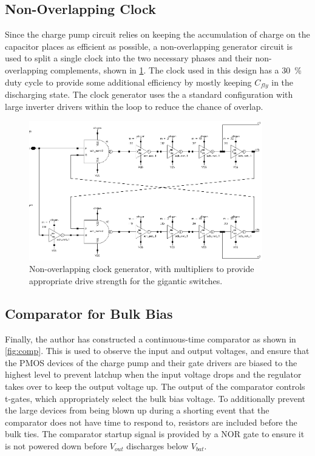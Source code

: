 \documentclass[11pt,letterpaper]{article}
\begin{document}
\subsection{Non-Overlapping Clock}

Since the charge pump circuit relies on keeping the accumulation of charge on the capacitor places as efficient as possible, a non-overlapping generator circuit is used to split a single clock into the two necessary phases and their non-overlapping complements, shown in \cref{fig:clkgen}. The clock used in this design has a \qty{30}{\%} duty cycle to provide some additional efficiency by mostly keeping \(C_{fly}\) in the discharging state. The clock generator uses the a standard configuration with large inverter drivers within the loop to reduce the chance of overlap.

\begin{figure}[ht]
    \centering
    \includegraphics[width=4in]{images/cp_sch_clk.eps} 
    \caption{Non-overlapping clock generator, with multipliers to provide appropriate drive strength for the gigantic switches.}\label{fig:clkgen}
\end{figure}

\subsection{Comparator for Bulk Bias}

Finally, the author has constructed a continuous-time comparator as shown in \cref{fig:comp}. This is used to observe the input and output voltages, and ensure that the PMOS devices of the charge pump and their gate drivers are biased to the highest level to prevent latchup when the input voltage drops and the regulator takes over to keep the output voltage up. The output of the comparator controls t-gates, which appropriately select the bulk bias voltage. To additionally prevent the large devices from being blown up during a shorting event that the comparator does not have time to respond to, resistors are included before the bulk ties. The comparator startup signal is provided by a NOR gate to ensure it is not powered down before \(V_{out}\) discharges below \(V_{bat}\).
\end{document}

